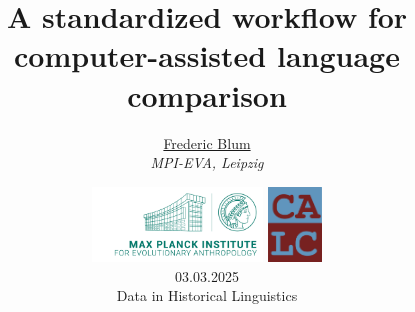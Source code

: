 \title[Computer-Assisted Language Comparison]
{A standardized workflow for computer-assisted language comparison}

\author[Frederic Blum]
    {%
           \texorpdfstring{\Large
					\centering
					\href{mailto:frederic_blum@eva.mpg.de.de}{Frederic Blum} \\
					\textit{\small{MPI-EVA, Leipzig}}
				\vspace*{-0.5cm}
        }
       {Blum}
}

\date{\hspace*{-1cm}
	\includegraphics[height=2cm]{images/title_MPI.png} \hspace*{0.5cm}
	\includegraphics[height=2cm]{images/title_calc.jpg} \vspace*{0.5cm}\\
	03.03.2025  \\  \vspace*{0.5cm} \footnotesize Data in Historical Linguistics
	}